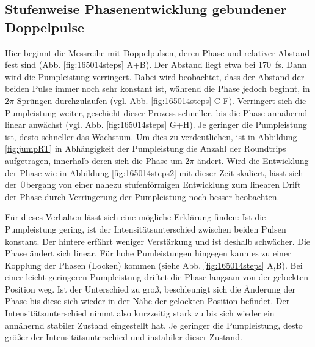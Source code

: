 \documentclass[bachelor,       %
               twoside,        %
               BCOR10mm,       %
               liststotoc,nomtotoc,bibtotoc, %
               english,ngerman, %
               final,          %
               ]{GAUBM}
\begin{document}
\subsection{Stufenweise Phasenentwicklung gebundener Doppelpulse}
\label{sec:steps}
Hier beginnt die Messreihe mit Doppelpulsen, deren Phase und relativer Abstand fest sind (Abb. \ref{fig:165014steps} A+B).
Der Abstand liegt etwa bei 170 \,fs.
Dann wird die Pumpleistung verringert.
Dabei wird beobachtet, dass der Abstand der beiden Pulse immer noch sehr konstant ist, während die Phase jedoch beginnt, in $2\pi$-Sprüngen durchzulaufen (vgl. Abb. \ref{fig:165014steps} C-F).
Verringert sich die Pumpleistung weiter, geschieht dieser Prozess schneller, bis die Phase annähernd linear anwächst (vgl. Abb. \ref{fig:165014steps} G+H).
Je geringer die Pumpleistung ist, desto schneller das Wachstum.
Um dies zu verdeutlichen, ist in Abbildung \ref{fig:jumpRT} in Abhängigkeit der Pumpleistung die Anzahl der Roundtrips aufgetragen, innerhalb deren sich die Phase um $2\pi$ ändert.
Wird die Entwicklung der Phase wie in Abbildung \ref{fig:165014steps2} mit dieser Zeit skaliert, lässt sich der Übergang von einer nahezu stufenförmigen Entwicklung zum linearen Drift der Phase durch Verringerung der Pumpleistung noch besser beobachten.

Für dieses Verhalten lässt sich eine  mögliche Erklärung finden:
Ist die Pumpleistung gering, ist der Intensitätsunterschied zwischen beiden Pulsen konstant.
Der hintere erfährt weniger Verstärkung und ist deshalb schwächer.
Die Phase ändert sich linear.
Für hohe Pumleistungen hingegen kann es zu einer Kopplung der Phasen (Locken) kommen (siehe Abb. \ref{fig:165014steps} A,B).
Bei einer leicht geringeren Pumpleistung driftet die Phase langsam von der gelockten Position weg.
Ist der Unterschied zu groß, beschleunigt sich die Änderung der Phase bis diese sich wieder in der Nähe der gelockten Position befindet.
Der Intensitätsunterschied nimmt also kurzzeitig stark zu bis sich wieder ein annähernd stabiler Zustand eingestellt hat.
Je geringer die Pumpleistung, desto größer der Intensitätsunterschied und instabiler dieser Zustand.
\end{document}
